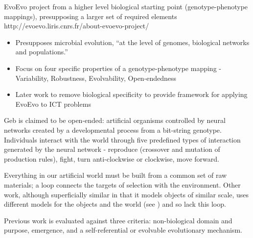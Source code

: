 EvoEvo project from a higher level biological starting point (genotype-phenotype mappings), presupposing a larger set of required elements http://evoevo.liris.cnrs.fr/about-evoevo-project/

\begin{itemize}
	\item Presupposes microbial evolution, ``at the level of genomes, biological networks and populations.''
	\item Focus on four specific properties of a genotype-phenotype mapping - Variability, Robustness, Evolvability, Open-endedness
	\item Later work to remove biological specificity to provide framework for applying EvoEvo to ICT problems
\end{itemize}

Geb \cite{Channon:iw,Channon:2001ly} is claimed to be open-ended: artificial organisms controlled by neural networks created by a developmental process from a bit-string genotype. Individuals interact with the world through five predefined types of interaction generated by the neural network - reproduce (crossover and mutation of production rules), fight, turn anti-clockwise or clockwise, move forward.

Everything in our artificial world must be built from a common set of raw materials; a loop connects the targets of selection with the environment. Other work, although superficially similar in that it models objects of similar scale, uses different models for the objects and the world (see \autocite{Sanchez-Dehesa:2008uq}) and so lack this loop.

Previous work is evaluated against three criteria: non-biological domain and purpose, emergence, and a self-referential or evolvable evolutionary mechanism.

